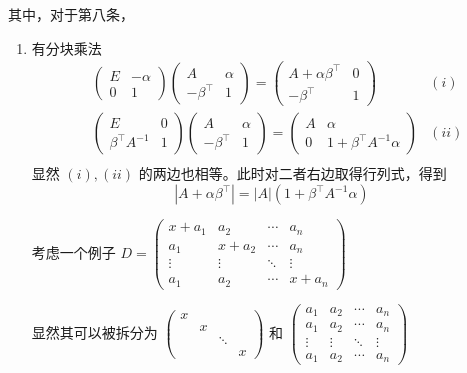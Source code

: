 其中，对于第八条，
\begin{enumerate}
    \item 有分块乘法
    \begin{equation*}
        \begin{aligned}
            &\begin{pmatrix}
                E&-\alpha\\0&1
            \end{pmatrix}
            \begin{pmatrix}
                A&\alpha\\-\beta^\top&1
            \end{pmatrix} = 
            \begin{pmatrix}
                A+\alpha\beta^\top & 0 \\ -\beta^\top  & 1
            \end{pmatrix}&(i)\\
            &\begin{pmatrix}
                E&0\\\beta^\top A^{-1} & 1
            \end{pmatrix}
            \begin{pmatrix}
                A&\alpha\\-\beta^\top&1
            \end{pmatrix} = 
            \begin{pmatrix}
                A & \alpha \\ 0 & 1+\beta^\top A^{-1}\alpha
            \end{pmatrix}&(ii)\\
        \end{aligned}
    \end{equation*}
    显然 $ (i),(ii) $ 的两边也相等。此时对二者右边取得行列式，得到$$
    |A + \alpha\beta^\top | = |A|(1+\beta^\top A^{-1}\alpha)
    $$ 

    考虑一个例子 $ D = \begin{pmatrix}
        x+a_1 & a_2 & \cdots& a_n\\ 
        a_1 & x+a_2 & \cdots& a_n\\ 
        \vdots & \vdots & \ddots & \vdots \\ 
        a_1 & a_2 & \cdots & x+a_n
    \end{pmatrix} $ 
    
    显然其可以被拆分为 $ \begin{pmatrix}
        x&&&\\ &x&& \\ &&\ddots& \\ &&&x
    \end{pmatrix} $ 和 $ \begin{pmatrix}
        a_1 & a_2 & \cdots& a_n\\ 
        a_1 & a_2 & \cdots& a_n\\ 
        \vdots & \vdots & \ddots & \vdots \\ 
        a_1 & a_2 & \cdots & a_n
    \end{pmatrix} $ 
    

\end{enumerate}
